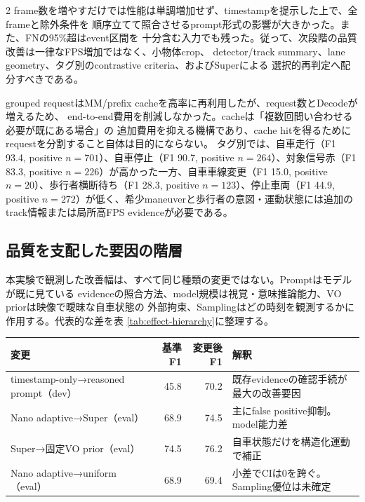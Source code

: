 \documentclass[9pt,a4paper]{extarticle}
\begin{document}
\begin{multicols}{2}
frame数を増やすだけでは性能は単調増加せず、timestampを提示した上で、全frameと除外条件を
順序立てて照合させるprompt形式の影響が大きかった。また、FNの95\%超はevent区間を
十分含む入力でも残った。従って、次段階の品質改善は一律なFPS増加ではなく、小物体crop、
detector/track summary、lane geometry、タグ別のcontrastive criteria、およびSuperによる
選択的再判定へ配分すべきである。

grouped requestはMM/prefix cacheを高率に再利用したが、request数とDecodeが増えるため、
end-to-end費用を削減しなかった。cacheは「複数回問い合わせる必要が既にある場合」の
追加費用を抑える機構であり、cache hitを得るためにrequestを分割すること自体は目的にならない。
タグ別では、自車走行（F1 93.4, positive $n=701$）、自車停止（F1 90.7, positive $n=264$）、対象信号赤（F1 83.3, positive $n=226$）が高かった一方、自車車線変更（F1 15.0, positive $n=20$）、歩行者横断待ち（F1 28.3, positive $n=123$）、停止車両（F1 44.9, positive $n=272$）が低く、希少maneuverと歩行者の意図・運動状態には追加のtrack情報または局所高FPS evidenceが必要である。

\subsection{品質を支配した要因の階層}
本実験で観測した改善幅は、すべて同じ種類の変更ではない。Promptはモデルが既に見ている
evidenceの照合方法、model規模は視覚・意味推論能力、VO priorは映像で曖昧な自車状態の
外部拘束、Samplingはどの時刻を観測するかに作用する。代表的な差を表
\ref{tab:effect-hierarchy}に整理する。

\begin{center}
\label{tab:effect-hierarchy}
\scriptsize
\begin{tabularx}{\columnwidth}{>{\raggedright\arraybackslash}Xrr>{\raggedright\arraybackslash}X}
\toprule
変更 & 基準F1 & 変更後F1 & 解釈\\
\midrule
timestamp-only→reasoned prompt（dev） & 45.8 & 70.2 &
既存evidenceの確認手続が最大の改善要因\\
Nano adaptive→Super（eval） & 68.9 & 74.5 &
主にfalse positive抑制。model能力差\\
Super→固定VO prior（eval） & 74.5 & 76.2 &
自車状態だけを構造化運動で補正\\
Nano adaptive→uniform（eval） & 68.9 & 69.4 &
小差でCIは0を跨ぐ。Sampling優位は未確定\\
\bottomrule
\end{tabularx}
\end{center}


\end{multicols}
\end{document}
